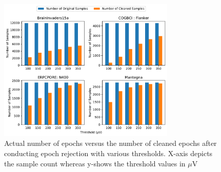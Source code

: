 \begin{figure}
    \centering
    \includegraphics[width=0.75\textwidth, height=0.8\textheight, keepaspectratio]{figures/peak_to_peak_threshold.pdf}  
    \caption{Actual number of epochs versus the number of cleaned epochs after conducting epoch rejection with various thresholds. X-axis depicts the sample count whereas y-shows the threshold values in $\mu$V}
    \label{fig:Peak to peak rejection}
\end{figure}

